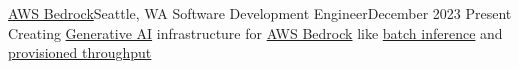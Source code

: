 \resumeSubheading
{\href{https://aws.amazon.com/bedrock/}{AWS Bedrock}}{Seattle, WA}
{Software Development Engineer}{December 2023 \textemdash Present}
\resumeItemListStart
{}
{Creating \href{https://en.wikipedia.org/wiki/Generative_artificial_intelligence}{Generative AI} infrastructure for \href{https://aws.amazon.com/bedrock/}{AWS Bedrock} like \href{https://docs.aws.amazon.com/bedrock/latest/userguide/batch-inference.html}{batch inference} and \href{https://docs.aws.amazon.com/bedrock/latest/userguide/prov-throughput.html}{provisioned throughput}}
\resumeItemListEnd
